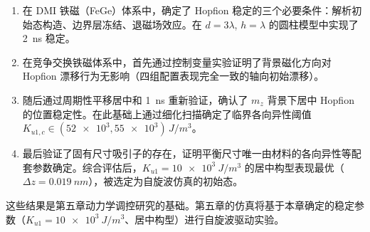 \begin{enumerate}[label=(\arabic*)]
  \item 在 DMI 铁磁（FeGe）体系中，确定了 Hopfion 稳定的三个必要条件：解析初始态构造、边界层冻结、退磁场效应。在 $d = 3\lambda$, $h = \lambda$ 的圆柱模型中实现了 \SI{2}{ns} 稳定。
  \item 在竞争交换铁磁体系中，首先通过控制变量实验证明了背景磁化方向对 Hopfion 漂移行为无影响（四组配置表现完全一致的轴向初始漂移）。
  \item 随后通过周期性平移居中和 \SI{1}{ns} 重新验证，确认了 $m_z$ 背景下居中 Hopfion 的位置稳定性。在此基础上通过细化扫描确定了临界各向异性阈值 $K_{u1,c} \in (\num{52e3}, \num{55e3}) \, \si{J/m^3}$。
  \item 最后验证了固有尺寸吸引子的存在，证明平衡尺寸唯一由材料的各向异性等配套参数确定。综合评估后，$K_{u1} = \SI{10e3}{J/m^3}$ 的居中构型表现最优（$\Delta z = \SI{0.019}{nm}$），被选定为自旋波仿真的初始态。
\end{enumerate}

这些结果是第五章动力学调控研究的基础。第五章的仿真将基于本章确定的稳定参数（$K_{u1} = \SI{10e3}{J/m^3}$、居中构型）进行自旋波驱动实验。
